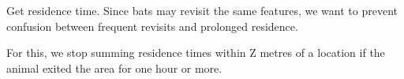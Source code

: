 \documentclass[
]{scrreprt}
\newenvironment{Shaded}{}{}
\newcommand{\CommentTok}[1]{\textcolor[rgb]{0.38,0.63,0.69}{\textit{#1}}}
\newcommand{\KeywordTok}[1]{\textcolor[rgb]{0.00,0.44,0.13}{\textbf{#1}}}
\newcommand{\NormalTok}[1]{#1}
\newcommand{\OperatorTok}[1]{\textcolor[rgb]{0.40,0.40,0.40}{#1}}
\newcommand{\StringTok}[1]{\textcolor[rgb]{0.25,0.44,0.63}{#1}}
\begin{document}
\begin{Shaded}
\end{Shaded}

Get residence time. Since bats may revisit the same features, we want to prevent confusion between frequent revisits and prolonged residence.

For this, we stop summing residence times within Z metres of a location if the animal exited the area for one hour or more.
\end{document}
